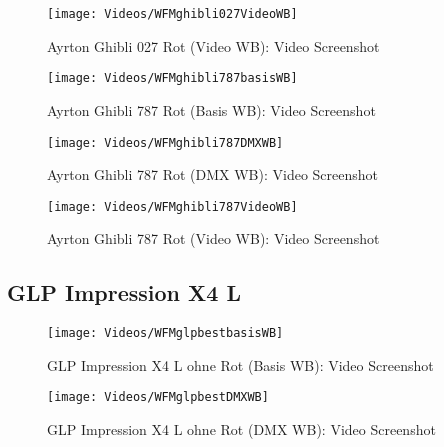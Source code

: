 \documentclass[pagesize,paper=A4,fontsize=12pt,utf8,numbers=noenddot,bibliography=totoc,listof=totoc,DIV=11,BCOR=1mm]{scrreprt}
\begin{document}
\begin{figure}[htp]     %
\centering
\texttt{[image: Videos/WFMghibli027VideoWB]} 
\caption {Ayrton Ghibli 027 Rot (Video WB): Video Screenshot} 
\end{figure}



\begin{figure}[htp]     %
\centering
\texttt{[image: Videos/WFMghibli787basisWB]} 
\caption {Ayrton Ghibli 787 Rot (Basis WB): Video Screenshot} 
\end{figure}

\begin{figure}[htp]     %
\centering
\texttt{[image: Videos/WFMghibli787DMXWB]} 
\caption {Ayrton Ghibli 787 Rot (DMX WB): Video Screenshot} 
\end{figure}

\begin{figure}[htp]     %
\centering
\texttt{[image: Videos/WFMghibli787VideoWB]} 
\caption {Ayrton Ghibli 787 Rot (Video WB): Video Screenshot} 
\end{figure}



\subsection{GLP Impression X4 L}

\begin{figure}[htp]     %
\centering
\texttt{[image: Videos/WFMglpbestbasisWB]} 
\caption {GLP Impression X4 L ohne Rot (Basis WB): Video Screenshot} 
\end{figure}

\begin{figure}[htp]     %
\centering
\texttt{[image: Videos/WFMglpbestDMXWB]} 
\caption {GLP Impression X4 L ohne Rot (DMX WB): Video Screenshot} 
\end{figure}
\end{document}
